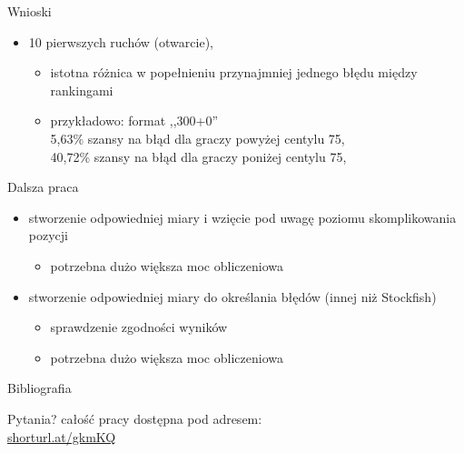 \documentclass{beamer}
\begin{document}
\begin{frame}{Wnioski}
	\begin{itemize}
		\item 10 pierwszych ruchów (otwarcie), 
		\begin{itemize}
			\item istotna różnica w popełnieniu przynajmniej jednego  błędu między rankingami
			\item przykładowo: format ,,300+0''\\ 
			\phantom{4}5,63\% szansy na błąd dla graczy powyżej centylu 75, \\
			40,72\% szansy na błąd dla graczy poniżej centylu 75, \\
		\end{itemize}	
	\end{itemize}
\end{frame}


\begin{frame}{Dalsza praca}
	\begin{itemize}
		\item stworzenie odpowiedniej miary i wzięcie pod uwagę poziomu skomplikowania pozycji
		\begin{itemize}
			\item potrzebna dużo większa moc obliczeniowa	
		\end{itemize}
	
		\item stworzenie odpowiedniej miary do określania błędów (innej niż Stockfish)
		\begin{itemize}
			\item sprawdzenie zgodności wyników
			\item potrzebna dużo większa moc obliczeniowa	
		\end{itemize}
	\end{itemize}
	
\end{frame}

\begin{frame}{Bibliografia}
	 
\end{frame}

\begin{frame}{Pytania?}
	całość pracy dostępna pod adresem:\\ \url{shorturl.at/gkmKQ}
\end{frame}
\end{document}
